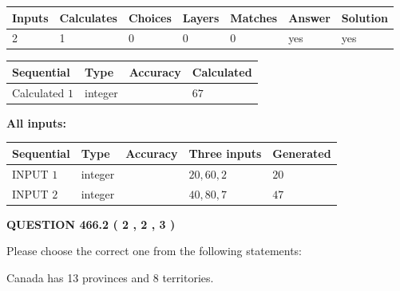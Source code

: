 \documentclass[12pt]{article}
\begin{document}
 

 
   
   
   
   
\noindent\begin{tabular}{|l|l|l|l|l|l|l|}
 \hline
Inputs & Calculates & Choices & Layers & Matches & Answer & Solution \\ \hline
 2  & 
 1  & 
 0
  & 
 0  & 
 0  & 
  yes & 
  yes 
  \\ \hline
 \end{tabular}
   
   
   
   
\noindent{}
   
   
  
  
\noindent\begin{tabular}{|l|l|l|l|}
\hline
 Sequential & Type & Accuracy & Calculated \\ 
\hline
 
 
  Calculated $  1 $ & integer &  & 
  $ 67 $ 
 \\  \hline  
 \end{tabular}
   
   
   
   
\noindent\vspace{0.1in}\hspace{-0.08in} {\textbf{\Large{All inputs: }}}
   
   
  
  
\noindent\begin{tabular}{|l|l|l|l|l|}
\hline
 Sequential & Type & Accuracy & Three inputs & Generated \\ 
\hline
 
 
  INPUT $  1 $ & integer &  & $
 20
 , 
 60
 , 
 2
 $ & $ 20 $ 
 \\  \hline  
 
 
  INPUT $  2 $ & integer &  & $
 40
 , 
 80
 , 
 7
 $ & $ 47 $ 
 \\  \hline  
 \end{tabular}
   
   
  
\vspace{0.2in}
  
{\textbf{\Large{QUESTION
466.2 
 ( 2 , 2 , 3 )
}}}
  
  
Please choose the correct one from the following statements:
 
 
Canada has  13 provinces and  8 territories.
 
\end{document}
